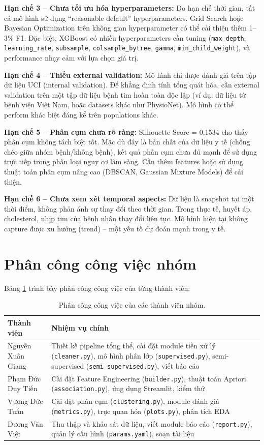 \textbf{Hạn chế 3 -- Chưa tối ưu hóa hyperparameters:} Do hạn chế thời gian, tất cả mô hình sử dụng ``reasonable default'' hyperparameters. Grid Search hoặc Bayesian Optimization trên không gian hyperparameter có thể cải thiện thêm 1--3\% F1. Đặc biệt, XGBoost có nhiều hyperparameters cần tuning (\texttt{max\_depth}, \texttt{learning\_rate}, \texttt{subsample}, \texttt{colsample\_bytree}, \texttt{gamma}, \texttt{min\_child\_weight}), và performance nhạy cảm với lựa chọn giá trị.

\textbf{Hạn chế 4 -- Thiếu external validation:} Mô hình chỉ được đánh giá trên tập dữ liệu UCI (internal validation). Để khẳng định tính tổng quát hóa, cần external validation trên một tập dữ liệu bệnh tim hoàn toàn độc lập (ví dụ: dữ liệu từ bệnh viện Việt Nam, hoặc datasets khác như PhysioNet). Mô hình có thể perform khác biệt đáng kể trên populations khác.

\textbf{Hạn chế 5 -- Phân cụm chưa rõ ràng:} Silhouette Score = 0.1534 cho thấy phân cụm không tách biệt tốt. Mặc dù đây là bản chất của dữ liệu y tế (chồng chéo giữa nhóm bệnh/không bệnh), kết quả phân cụm chưa đủ mạnh để sử dụng trực tiếp trong phân loại nguy cơ lâm sàng. Cần thêm features hoặc sử dụng thuật toán phân cụm nâng cao (DBSCAN, Gaussian Mixture Models) để cải thiện.

\textbf{Hạn chế 6 -- Chưa xem xét temporal aspects:} Dữ liệu là snapshot tại một thời điểm, không phản ánh sự thay đổi theo thời gian. Trong thực tế, huyết áp, cholesterol, nhịp tim của bệnh nhân thay đổi liên tục. Mô hình hiện tại không capture được xu hướng (trend) -- một yếu tố dự đoán mạnh trong y tế.

\section{Phân công công việc nhóm}

Bảng \ref{tab:contribution} trình bày phân công công việc của từng thành viên:

\begin{table}[H]
\centering
\caption{Phân công công việc của các thành viên nhóm.}
\label{tab:contribution}
\begin{tabular}{|l|p{8cm}|}
\hline
\textbf{Thành viên} & \textbf{Nhiệm vụ chính} \\ \hline
Nguyễn Xuân Giang & Thiết kế pipeline tổng thể, cài đặt module tiền xử lý (\texttt{cleaner.py}), mô hình phân lớp (\texttt{supervised.py}), semi-supervised (\texttt{semi\_supervised.py}), viết báo cáo \\ \hline
Phạm Đức Duy Tiến & Cài đặt Feature Engineering (\texttt{builder.py}), thuật toán Apriori (\texttt{association.py}), ứng dụng Streamlit, kiểm thử \\ \hline
Vương Đức Tuấn & Cài đặt phân cụm (\texttt{clustering.py}), module đánh giá (\texttt{metrics.py}), trực quan hóa (\texttt{plots.py}), phân tích EDA \\ \hline
Dương Văn Việt & Thu thập và khảo sát dữ liệu, viết module báo cáo (\texttt{report.py}), quản lý cấu hình (\texttt{params.yaml}), soạn tài liệu \\ \hline
\end{tabular}
\end{table}

